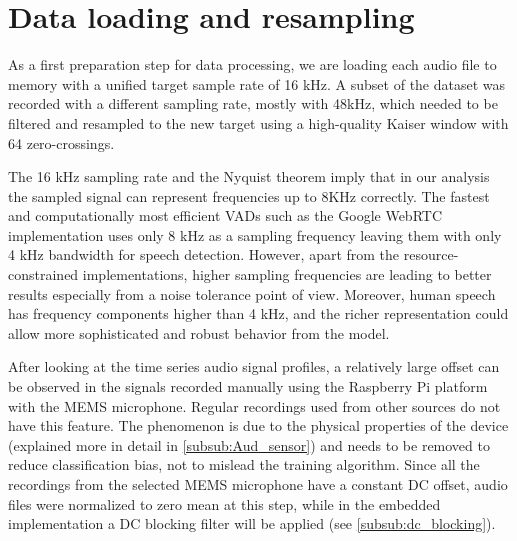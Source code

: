 


\section{Data loading and resampling}

As a first preparation step for data processing, we are loading each audio file to memory with a unified target sample rate of 16 kHz. A subset of the dataset was recorded with a different sampling rate, mostly with 48kHz, which needed to be filtered and resampled to the new target using a high-quality Kaiser window with 64 zero-crossings.

The 16 kHz sampling rate and the Nyquist theorem imply that in our analysis the sampled signal can represent frequencies up to 8KHz correctly. The fastest and computationally most efficient VADs such as the Google WebRTC implementation uses only 8 kHz as a sampling frequency leaving them with only 4 kHz bandwidth for speech detection. However, apart from the resource-constrained implementations, higher sampling frequencies are leading to better results especially from a noise tolerance point of view. Moreover, human speech has frequency components higher than 4 kHz, and the richer representation could allow more sophisticated and robust behavior from the model.


After looking at the time series audio signal profiles, a relatively large offset can be observed in the signals recorded manually using the Raspberry Pi platform with the MEMS microphone. Regular recordings used from other sources do not have this feature. The phenomenon is due to the physical properties of the device (explained more in detail in \autoref{subsub:Aud_sensor}) and needs to be removed to reduce classification bias, not to mislead the training algorithm. Since all the recordings from the selected MEMS microphone have a constant DC offset, audio files were normalized to zero mean at this step, while in the embedded implementation a DC blocking filter will be applied (see \autoref{subsub:dc_blocking}).

